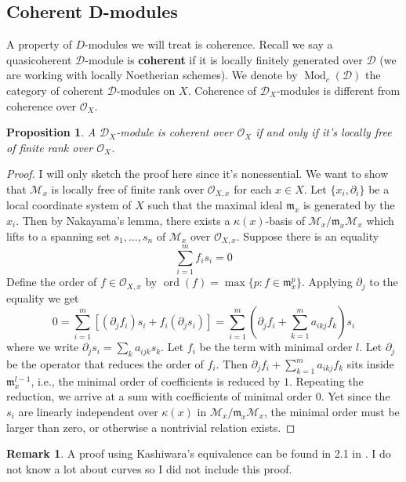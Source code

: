 \documentclass[11pt, a4paper]{article}
\newtheorem{proposition}[theorem]{Proposition}
\theoremstyle{definition}
\newtheorem{remark}[theorem]{Remark}
\newcommand{\ord}[0]{\operatorname{ord}}
\newcommand{\Mod}{\operatorname{Mod}}
\begin{document}
    \subsection{Coherent D-modules}
    A property of $D$-modules we will treat is coherence. Recall we say a quasicoherent $\mathcal D$-module is \textbf{coherent} if it is locally finitely generated over $\mathcal D$ (we are working with locally Noetherian schemes). We denote by $\Mod_c(\mathcal D)$ the category of coherent $\mathcal D$-modules on $X$. Coherence of $\mathcal D_X$-modules is different from coherence over $\mathcal O_X$.
    \begin{proposition}\label{prop-ox-coh-loc-free}
        A $\mathcal D_X$-module is coherent over $\mathcal O_X$ if and only if it's locally free of finite rank over $\mathcal O_X$.
    \end{proposition}
    \begin{proof}
        I will only sketch the proof here since it's nonessential. We want to show that $\mathcal M_x$ is locally free of finite rank over $\mathcal O_{X, x}$ for each $x\in X$. Let $\{x_i,\partial_i\}$ be a local coordinate system of $X$ such that the maximal ideal $\mathfrak m_x$ is generated by the $x_i$. Then by Nakayama's lemma, there exists a $\kappa(x)$-basis of $\mathcal M_x/\mathfrak m_x\mathcal M_x$ which lifts to a spanning set $s_1,\dots, s_n$ of $\mathcal M_x$ over $\mathcal O_{X, x}$. Suppose there is an equality
        \[\sum_{i=1}^mf_is_i=0\]
        Define the order of $f\in\mathcal O_{X, x}$ by $\ord(f)=\max\{p:f\in\mathfrak m_x^p\}$. Applying $\partial_j$ to the equality we get
        \[0=\sum_{i=1}^m[(\partial_jf_i)s_i+f_i(\partial_js_i)]=\sum_{i=1}^m\left(\partial_j f_i+\sum_{k=1}^m a_{ikj}f_k\right)s_i\]
        where we write $\partial_j s_i=\sum_k a_{ijk}s_k$. Let $f_i$ be the term with minimal order $l$. Let $\partial_j$ be the operator that reduces the order of $f_i$. Then $\partial_j f_i+\sum_{k=1}^m a_{ikj}f_k$ sits inside $\mathfrak m_x^{l-1}$, i.e., the minimal order of coefficients is reduced by $1$. Repeating the reduction, we arrive at a sum with coefficients of minimal order $0$. Yet since the $s_i$ are linearly independent over $\kappa(x)$ in $\mathcal M_x/\mathfrak m_x\mathcal M_x$, the minimal order must be larger than zero, or otherwise a nontrivial relation exists.
    \end{proof}
    \begin{remark}
        A proof using Kashiwara's equivalence can be found in 2.1 in \cite{bernstein-notes}. I do not know a lot about curves so I did not include this proof.
    \end{remark}
\end{document}
